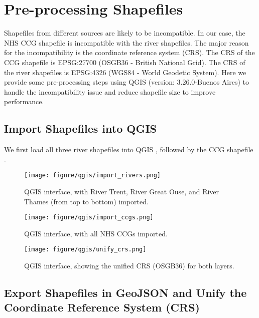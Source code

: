 \appendix

\section{Pre-processing Shapefiles}
\label{app:pre-processing}
Shapefiles from different sources are likely to be incompatible. In our case, the NHS CCG shapefile is incompatible with the river shapefiles. The major reason for the incompatibility is the coordinate reference system (CRS). The CRS of the CCG shapefile is EPSG:27700 (OSGB36 - British National Grid). The CRS of the river shapefiles is EPSG:4326 (WGS84 - World Geodetic System). Here we provide some pre-processing steps using QGIS (version: 3.26.0-Buenos Aires) \cite{qgisWelcome} to handle the incompatibility issue and reduce shapefile size to improve performance.

\subsection{Import Shapefiles into QGIS}
We first load all three river shapefiles into QGIS , followed by the CCG shapefile .

{
    \begin{figure}[tbh!]
        \centering
        \texttt{[image: figure/qgis/import\_rivers.png]}
        \caption{QGIS interface, with River Trent, River Great Ouse, and River Thames (from top to bottom) imported.}
        \label{fig:import_rivers}
    \end{figure}

    \begin{figure}[tbh!]
        \centering
        \texttt{[image: figure/qgis/import\_ccgs.png]}
        \caption{QGIS interface, with all NHS CCGs imported.}
        \label{fig:import_ccgs}
    \end{figure}

    \begin{figure}[tbh!]
        \centering
        \texttt{[image: figure/qgis/unify\_crs.png]}
        \caption{QGIS interface, showing the unified CRS (OSGB36) for both layers.}
        \label{fig:unify_crs}
    \end{figure}
}

\subsection{Export Shapefiles in GeoJSON and Unify the Coordinate Reference System (CRS)}

